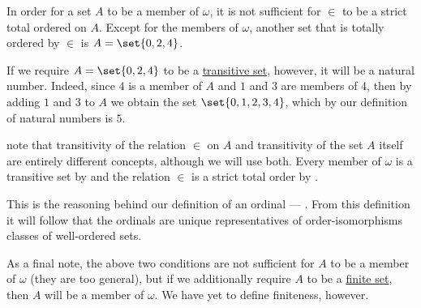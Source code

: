 \begin{remark}
  In order for a set \( A \) to be a member of \( \omega \), it is not sufficient for \( \in \) to be a strict total ordered on \( A \). Except for the members of \( \omega \), another set that is totally ordered by \( \in \) is \( A = \set{ 0, 2, 4 } \).

  If we require \( A = \set{ 0, 2, 4 } \) to be a \hyperref[def:transitive_set]{transitive set}, however, it will be a natural number. Indeed, since \( 4 \) is a member of \( A \) and \( 1 \) and \( 3 \) are members of \( 4 \), then by adding \( 1 \) and \( 3 \) to \( A \) we obtain the set \( \set{ 0, 1, 2, 3, 4 } \), which by our definition of natural numbers is \( 5 \).

  note that transitivity of the relation \( \in \) on \( A \) and transitivity of the set \( A \) itself are entirely different concepts, although we will use both. Every member of \( \omega \) is a transitive set by  and the relation \( \in \) is a strict total order by .

  This is the reasoning behind our definition of an ordinal --- . From this definition it will follow that the ordinals are unique representatives of order-isomorphisms classes of well-ordered sets.

  As a final note, the above two conditions are not sufficient for \( A \) to be a member of \( \omega \) (they are too general), but if we additionally require \( A \) to be a \hyperref[def:set_finiteness]{finite set}, then \( A \) will be a member of \( \omega \). We have yet to define finiteness, however.
\end{remark}

